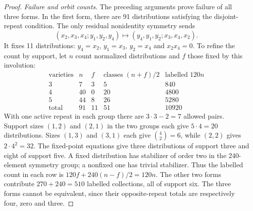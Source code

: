 \begin{proof}
\emph{Failure and orbit counts.} The preceding arguments prove failure of all three forms. In the first
form, there are 91 distributions satisfying the disjoint-repeat condition.
The only residual nonidentity symmetry sends
\[
 (x_2,x_3,x_4;y_1,y_2,y_4)
 \longmapsto (y_4,y_1,y_2;x_3,x_4,x_2).
\]
It fixes 11 distributions: $y_4=x_2$, $y_1=x_3$, $y_2=x_4$ and
$x_2x_4=0$. To refine the count by support, let $n$ count normalized
distributions and $f$ those fixed by this involution:
\[
\begin{array}{c|rr|r|r}
 \text{varieties}&n&f&\text{classes }(n+f)/2&\text{labelled }120n\\\hline
 3&7&3&5&840\\
 4&40&0&20&4800\\
 5&44&8&26&5280\\\hline
 \text{total}&91&11&51&10920
\end{array}
\]
With one active repeat in each group there are $3\cdot3-2=7$
allowed pairs. Support sizes $(1,2)$ and $(2,1)$ in the two groups each
give $5\cdot4=20$ distributions. Sizes $(1,3)$ and $(3,1)$ each give
$\binom42=6$, while $(2,2)$ gives $2\cdot4^2=32$.
The fixed-point equations give three distributions of support three and
eight of support five. A fixed distribution has stabilizer of order two
in the 240-element symmetry group; a nonfixed one has trivial stabilizer.
Thus the labelled count in each row is
$120f+240(n-f)/2=120n$.
The other two forms contribute $270+240=510$ labelled collections,
all of support six. The three
forms cannot be equivalent, since their opposite-repeat totals are
respectively four, zero and three.


\end{proof}
